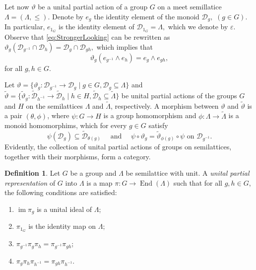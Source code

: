 \documentclass{amsart}
\newcommand{\D}{{\mathcal D}}
\newcommand{\0}{{\vartheta}}
\newcommand{\m}{{}^{-1}}
\theoremstyle{definition}
\newtheorem{defn}[thm]{Definition}
\theoremstyle{remark}
\numberwithin{equation}{section}
\newtheorem*{Theorem A}{\textbf{Theorem A}}
\newtheorem*{Corollary E}{\textbf{Corollary E}}
\newtheorem*{Corollary F}{\textbf{Corollary F}}
\newtheorem*{Theorem B}{\textbf{Theorem B}}
\newtheorem*{Theorem C}{\textbf{Theorem C}}
\newtheorem*{Theorem D}{\textbf{Theorem B}}
\newtheorem*{p a}{\textbf{Proof of  Theorem A}}
\newtheorem*{p b}{\textbf{Proof of Theorem B}}
\newtheorem*{p c}{\textbf{Proof of  Theorem C}}
\newtheorem*{p d}{\textbf{Proof of  Theorem D}}
\DeclareMathOperator{\im}{im}
\DeclareMathOperator{\en}{End}
\begin{document}
Let now $\0 $ be a unital partial action of a group $G$ on a meet semillatice  $\Lambda = (\Lambda , \leq).$ Denote by $e_g$ the identity element of the monoid $\D _g, $  $(g\in G).$ In particular, $e_{1_G}$ is the identity element of $\D _{1_G}= \Lambda , $  which we denote by $\varepsilon .$ Observe that \eqref{eq:StrongerLooking} can be rewritten as 
${\0}_g({\D}_{g\m} \cap
{\D}_{h}) = \D_{g} \cap \D_{gh},$ which implies that 
\begin{equation}\label{eq:IdempotentsRule}
\0_g(e_{g\m} \wedge e_h) = e_g \wedge e_{gh},
\end{equation} for all $g,h \in G.$


Let $\0=\{\0_g: \D_{g^{-1}}\to \D_g\mid g\in G, \D_g\subseteq \Lambda\}$ and $\widetilde\0=\{\widetilde\0_g:\widetilde\D_{h^{-1}}\to \widetilde\D_h\mid h\in H, \widetilde\D_h\subseteq \widetilde\Lambda\}$ be unital partial actions of the groups $G$ and $H$ on the semilattices $\Lambda$ and $\widetilde\Lambda$, respectively. A morphism between $\0$ and $\widetilde\0$ is a pair $(\theta,\phi)$, where $\psi: G\to H$ is a group homomorphism and $\phi: \Lambda\to \widetilde\Lambda$ is a monoid homomorphims, which for every $g\in G$ satisfy
$$\psi(\D_g)\subseteq \widetilde\D_{\theta(g)} \quad\mbox{ and }\quad \psi\circ \0_g=\widetilde\0_{\phi(g)}\circ \psi \mbox{ on } \D_{g^{-1}}.$$
Evidently, the collection of unital partial actions of groups on semilattices, together with their morphisms, form a category. 



\begin{defn}\label{d: partial representation}
    Let \(G\) be a group and \(\Lambda\) be semilattice with unit.  A {\em unital partial representation} of \(G\) into \(\Lambda\) is a map \(\pi: G \to \en(\Lambda)\) such that for all \(g, h \in G\), the following conditions are satisfied:
    \begin{enumerate}
        \item $\im \pi_g$ is a unital ideal of $\Lambda$; 
        \item \(\pi_{1_G}\) is the identity map on \(\Lambda\); 
        \item \(\pi_{g^{-1}}\pi_{g}\pi_{h} = \pi_{g^{-1}}\pi_{gh}\);
        \item \(\pi_{g}\pi_{h}\pi_{h^{-1}} = \pi_{gh}\pi_{h^{-1}}\).
    \end{enumerate}
\end{defn}
\end{document}
